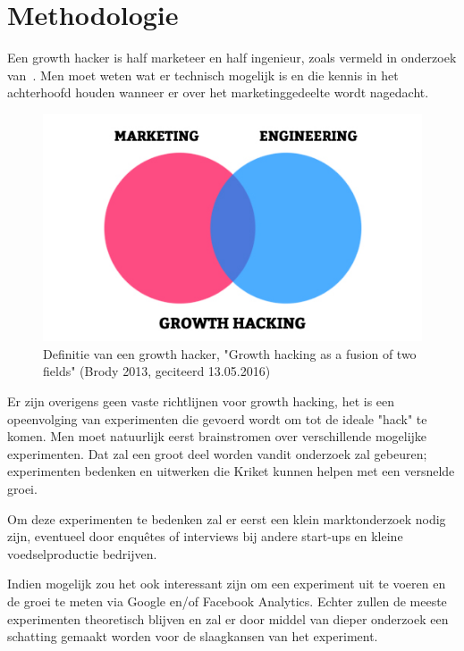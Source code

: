 \section{Methodologie}
\label{sec:methodologie}

Een growth hacker is half marketeer en half ingenieur, zoals vermeld in onderzoek van~\textcite{Lee2016}. Men moet weten wat er technisch mogelijk is en die kennis in het achterhoofd houden wanneer er over het marketinggedeelte wordt nagedacht. 

\begin{figure}[h!]
	\includegraphics[width=\linewidth]{growth-hacker-definition.jpg}
	\caption{Definitie van een growth hacker, "Growth hacking as a fusion of two fields"  (Brody 2013, geciteerd 13.05.2016)}
	\label{fig:defGrowthHacker}
\end{figure}

Er zijn overigens geen vaste richtlijnen voor growth hacking, het is een opeenvolging van experimenten die gevoerd wordt om tot de ideale "hack" te komen. Men moet natuurlijk eerst brainstromen over verschillende mogelijke experimenten. Dat zal een groot deel worden vandit onderzoek zal gebeuren; experimenten bedenken en uitwerken die Kriket kunnen helpen met een versnelde groei.

Om deze experimenten te bedenken zal er eerst een klein marktonderzoek nodig zijn, eventueel door enquêtes of interviews bij andere start-ups en kleine voedselproductie bedrijven. 

Indien mogelijk zou het ook interessant zijn om een experiment uit te voeren en de groei te meten via Google en/of Facebook Analytics. Echter zullen de meeste experimenten theoretisch blijven en zal er door middel van dieper onderzoek een schatting gemaakt worden voor de slaagkansen van het experiment.

